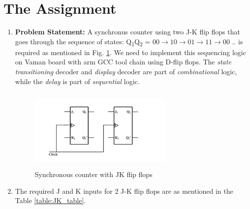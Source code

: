 \documentclass[journal,12pt,twocolumn]{IEEEtran}
\begin{document}
\section{\textbf{The Assignment}}
\begin{enumerate}[1.]
\item \textbf{Problem Statement:} A synchronus counter using two J-K flip flops that goes through the sequence of states: Q\textsubscript{1}Q\textsubscript{2} = $00 \rightarrow 10 \rightarrow 01 \rightarrow 11 \rightarrow 00$ .. is required as mentioned in Fig. \ref{fig:JKcounter}.  We need to implement this sequencing logic on Vaman board with arm GCC tool chain using D-flip flops. The {\em state transitioning } decoder and {\em display} decoder are part of {\em combinational} logic, while the {\em delay} is part of {\em sequential} logic.

\begin{figure}[!h]
	\begin{center}
	\includegraphics[width=7cm,height=4cm]{./JK1}
\end{center}
\caption{Synchronous counter with JK flip flops}
\label{fig:JKcounter}
\end{figure}
%

\item The required J and K inputs for 2 J-K flip flops are as mentioned in the Table \ref{table:JK_table}. \\


\end{enumerate}
\end{document}
